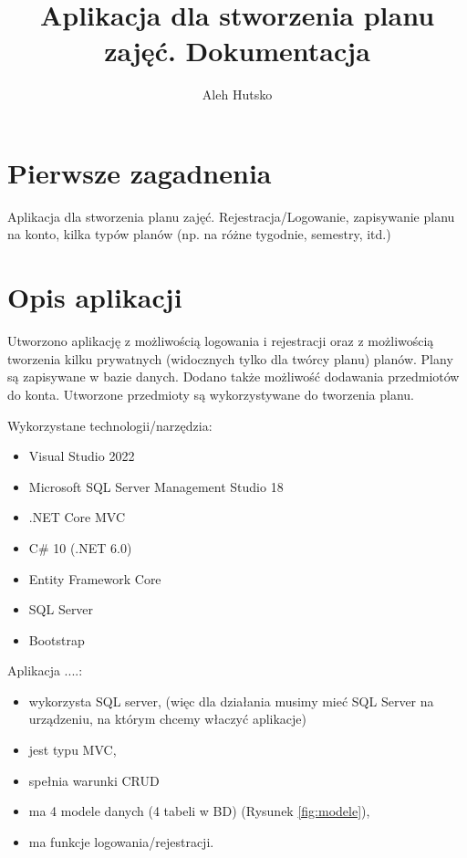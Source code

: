 \documentclass[a4paper,12pt,oneside]{book} %
\title{Aplikacja dla stworzenia planu zajęć. Dokumentacja}
\author{Aleh Hutsko}
\begin{document}
\maketitle

\tableofcontents{}

\chapter*{Pierwsze zagadnenia}
Aplikacja dla stworzenia planu zajęć. Rejestracja/Logowanie, zapisywanie planu na konto, kilka typów planów (np. na różne tygodnie, semestry, itd.)


\chapter*{Opis aplikacji}

Utworzono aplikację z możliwością logowania i rejestracji oraz z możliwością tworzenia kilku prywatnych (widocznych tylko dla twórcy planu) planów.
Plany są zapisywane w bazie danych. Dodano także możliwość dodawania przedmiotów do konta.
Utworzone przedmioty są wykorzystywane do tworzenia planu.

Wykorzystane technologii/narzędzia:
\begin{itemize}
    \item Visual Studio 2022
    \item Microsoft SQL Server Management Studio 18
    \item .NET Core MVC 
    \item C\# 10 (.NET 6.0)
    \item Entity Framework Core
    \item SQL Server
    \item Bootstrap
\end{itemize}

Aplikacja ....:

\begin{itemize}
    \item wykorzysta SQL server, (więc dla działania musimy mieć SQL Server na urządzeniu, na którym chcemy właczyć aplikacje)
    \item jest typu MVC,
    \item spełnia warunki CRUD
    \item ma 4 modele danych (4 tabeli w BD) (Rysunek \ref{fig:modele}),
    \item ma funkcje logowania/rejestracji.
\end{itemize}
\end{document}
